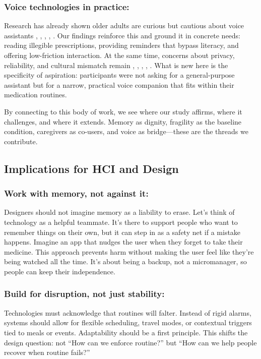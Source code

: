 \documentclass[acmlarge]{acmart}
\begin{document}
\subsubsection{Voice technologies in practice: }
Research has already shown older adults are curious but cautious about
voice assistants \cite{10.1145/3706599.3720033}, \cite{10.1145/3565698.3565774}, \cite{info:doi/10.2196/66778}, \cite{10.1145/3623809.3623827}, \cite{10.1145/3517428.3544830}. Our findings reinforce this and
ground it in concrete needs: reading illegible prescriptions, providing
reminders that bypass literacy, and offering low-friction interaction.
At the same time, concerns about privacy, reliability, and cultural
mismatch remain \cite{Enam24032025}, \cite{10.1007/s10514-025-10190-y}, \cite{10.1007/978-3-031-91760-8_6}, \cite{10.1145/3712275}, \cite{10.1145/3700794.3700803}. What is new here is the
specificity of aspiration: participants were not asking for a
general-purpose assistant but for a narrow, practical voice companion
that fits within their medication routines.

By connecting to this body of work, we see where our study affirms,
where it challenges, and where it extends. Memory as dignity, fragility
as the baseline condition, caregivers as co-users, and voice as
bridge---these are the threads we contribute.


\subsection{Implications for HCI and Design}
\subsubsection{Work with memory, not against it: }
Designers should not imagine memory as a liability to erase. Let's think
of technology as a helpful teammate. It's there to support people who
want to remember things on their own, but it can step in as a safety net
if a mistake happens. Imagine an app that nudges the user when they
forget to take their medicine. \cite{10.1145/3706598.3713563} This approach prevents
harm without making the user feel like they're being watched all the
time. It's about being a backup, not a micromanager, so people can keep
their independence\cite{10.1145/3706598.3714093}.

\subsubsection{Build for disruption, not just stability: }
Technologies must acknowledge that routines will falter. Instead of
rigid alarms, systems should allow for flexible scheduling, travel
modes, or contextual triggers tied to meals or events.\cite{10.1145/3706599.3719286}
Adaptability should be a first principle. This shifts the design
question: not ``How can we enforce routine?'' but ``How can we help
people recover when routine fails?''
\end{document}
